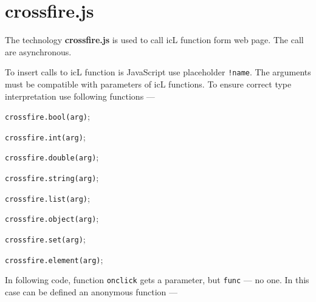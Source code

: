 \section{crossfire.js}

The technology {\bf crossfire.js} is used to call icL function form web page. The call are asynchronous.

To insert calls to icL function is JavaScript use placeholder \texttt{!{name}}. The arguments must be compatible with parameters of icL functions. To ensure correct type interpretation use following functions —
\begin{icItems}
	\item \texttt{crossfire.bool(arg)};
	\item \texttt{crossfire.int(arg)};
	\item \texttt{crossfire.double(arg)};
	\item \texttt{crossfire.string(arg)};
	\item \texttt{crossfire.list(arg)};
	\item \texttt{crossfire.object(arg)};
	\item \texttt{crossfire.set(arg)};
	\item \texttt{crossfire.element(arg)};
\end{icItems}

In following code, function \texttt{onclick} gets a parameter, but \texttt{func} — no one. In this case can be defined an anonymous function —
\inputminted[linenos]{icl}{../sources/crossfireexample.icL}
